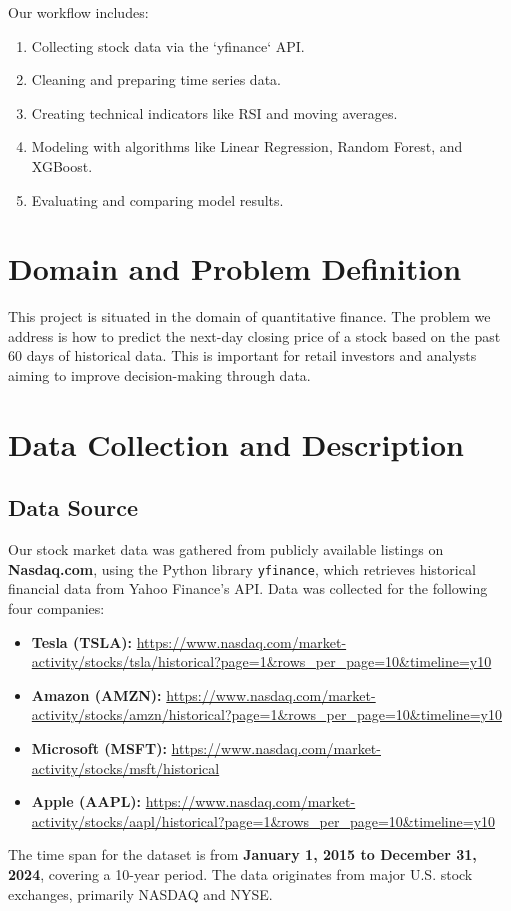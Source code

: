 \documentclass[runningheads]{llncs}
\begin{document}
Our workflow includes:
\begin{enumerate}
    \item Collecting stock data via the `yfinance` API.
    \item Cleaning and preparing time series data.
    \item Creating technical indicators like RSI and moving averages.
    \item Modeling with algorithms like Linear Regression, Random Forest, and XGBoost.
    \item Evaluating and comparing model results.
\end{enumerate}

\section{Domain and Problem Definition}
This project is situated in the domain of quantitative finance. The problem we address is how to predict the next-day closing price of a stock based on the past 60 days of historical data. This is important for retail investors and analysts aiming to improve decision-making through data.

\section{Data Collection and Description}

\subsection{Data Source}
Our stock market data was gathered from publicly available listings on \textbf{Nasdaq.com}, using the Python library \texttt{yfinance}, which retrieves historical financial data from Yahoo Finance's API. Data was collected for the following four companies:
\begin{itemize}
    \item \textbf{Tesla (TSLA):} \url{https://www.nasdaq.com/market-activity/stocks/tsla/historical?page=1&rows_per_page=10&timeline=y10}
    \item \textbf{Amazon (AMZN):} \url{https://www.nasdaq.com/market-activity/stocks/amzn/historical?page=1&rows_per_page=10&timeline=y10}
    \item \textbf{Microsoft (MSFT):} \url{https://www.nasdaq.com/market-activity/stocks/msft/historical}
    \item \textbf{Apple (AAPL):} \url{https://www.nasdaq.com/market-activity/stocks/aapl/historical?page=1&rows_per_page=10&timeline=y10}
\end{itemize}
The time span for the dataset is from \textbf{January 1, 2015 to December 31, 2024}, covering a 10-year period. The data originates from major U.S. stock exchanges, primarily NASDAQ and NYSE.
\end{document}

